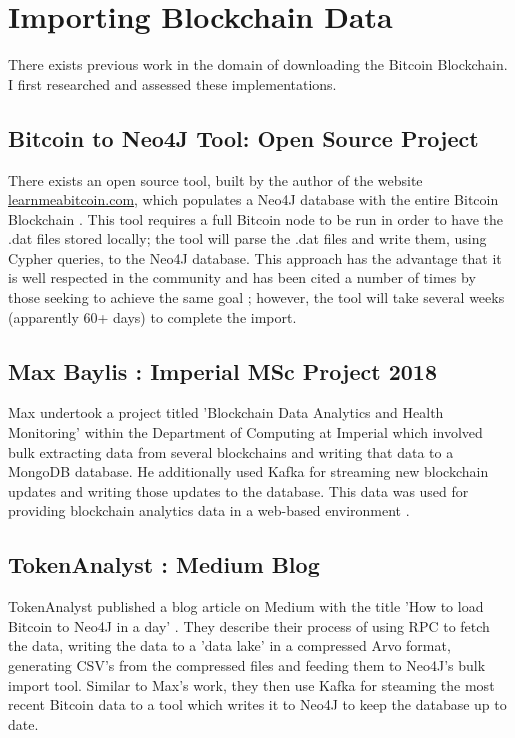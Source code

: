 \section{Importing Blockchain Data}\label{design-db-previous-work}
There exists previous work in the domain of downloading the Bitcoin Blockchain. I first researched and assessed these implementations. 

\subsection{Bitcoin to Neo4J Tool: Open Source Project}
There exists an open source tool, built by the author of the website \url{learnmeabitcoin.com}, which populates a Neo4J database with the entire Bitcoin Blockchain \cite{RefWorks:doc:5c98e031e4b068320632cef2}. This tool requires a full Bitcoin node to be run in order to have the .dat files stored locally; the tool will parse the .dat files and write them, using Cypher queries, to the Neo4J database. This approach has the advantage that it is well respected in the community and has been cited a number of times by those seeking to achieve the same goal \cite{RefWorks:doc:5c98e0cde4b044512c0b8641}; however, the tool will take several weeks (apparently 60+ days) to complete the import. 

\subsection{Max Baylis : Imperial MSc Project 2018}\label{background-max-baylist-project}
Max undertook a project titled 'Blockchain Data Analytics and Health Monitoring' within the Department of Computing at Imperial \cite{RefWorks:doc:5c6bd151e4b041254f892045} which involved bulk extracting data from several blockchains and writing that data to a MongoDB database. He additionally used Kafka for streaming new blockchain updates and writing those updates to the database. This data was used for providing blockchain analytics data in a web-based environment \cite{RefWorks:doc:5c6bd151e4b041254f892045}. 

\subsection{TokenAnalyst : Medium Blog}
TokenAnalyst published a blog article on Medium with the title 'How to load Bitcoin to Neo4J in a day' \cite{RefWorks:doc:5c98e0cde4b044512c0b8641}. They describe their process of using RPC to fetch the data, writing the data to a 'data lake' in a compressed Arvo format, generating CSV's from the compressed files and feeding them to Neo4J's bulk import tool. Similar to Max's work, they then use Kafka for steaming the most recent Bitcoin data to a tool which writes it to Neo4J to keep the database up to date. 

